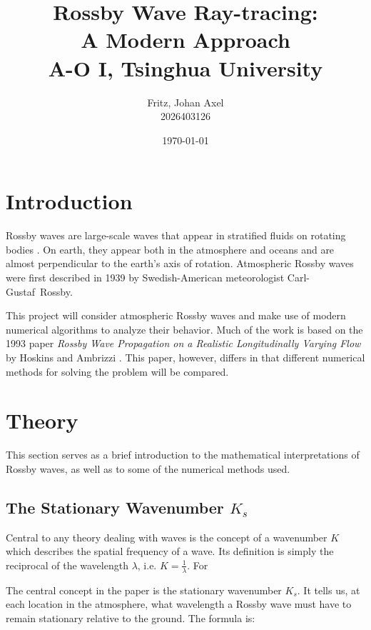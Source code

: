 \documentclass[]{article}
\title{Rossby Wave Ray-tracing:\\A Modern Approach
\\ \small A-O I, Tsinghua University}
\author{Fritz, Johan Axel \\ \small 2026403126}
\date{\today}
\begin{document}
	
	\maketitle
	
	\begin{abstract}
		
	\end{abstract}

	\section{Introduction}
	Rossby waves are large-scale waves that appear in stratified fluids on rotating bodies \cite{rossby}. On earth, they appear both in the atmosphere and oceans and are almost perpendicular to the earth's axis of rotation. Atmospheric Rossby waves were first described in 1939 by Swedish-American meteorologist Carl\mbox{-}Gustaf~Rossby. 
	
	This project will consider atmospheric Rossby waves and make use of modern numerical algorithms to analyze their behavior. Much of the work is based on the 1993 paper \emph{Rossby Wave Propagation on a Realistic Longitudinally Varying Flow} by Hoskins and Ambrizzi \cite{hoskins}. This paper, however, differs in that different numerical methods for solving the problem will be compared. 
	
	
	\section{Theory}
	This section serves as a brief introduction to the mathematical interpretations of Rossby waves, as well as to some of the numerical methods used. 
	\subsection{The Stationary Wavenumber $K_s$}
	Central to any theory dealing with waves is the concept of a wavenumber $K$ which describes the spatial frequency of a wave. Its definition is simply the reciprocal of the wavelength $\lambda$, i.e. $K=\tfrac1\lambda$. For
	
	
	The central concept in the paper is the stationary wavenumber $K_s$. It tells us, at each location in the atmosphere, what wavelength a Rossby wave must have to remain stationary relative to the ground. The formula is:
	
\end{document}
